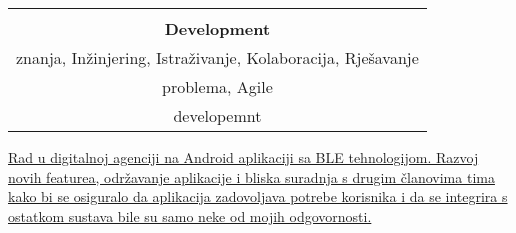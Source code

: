 \documentclass[theme]{cv_style}
\begin{document}
\begin{paracol}{2}
\begin{leftcolumn*}
{            %
            \vspace{1.75\sectionspace}
            \begin{minipage}[c]{\leftcolwidth}
                \begin{tabular}{c}
                    \hspace{-3pt}\bubblediagram{
                        {\textbf{Android} \\ \textbf{Development}},
                        Prenošenje\\znanja,
                        Inžinjering,
                        Istraživanje,
                        Kolaboracija,
                        Rješavanje\\problema,
                        Agile\\developemnt}
                \end{tabular}
            \end{minipage}
        }
        \end{leftcolumn*}
        \begin{rightcolumn}\noindent \small
            \hspace{-2.4pt}
            \href{https://www.cinnamon.agency}{
            {Rad u digitalnoj agenciji na Android aplikaciji sa BLE tehnologijom. Razvoj novih featurea, održavanje aplikacije i bliska suradnja s drugim članovima tima kako bi se osiguralo da aplikacija zadovoljava potrebe korisnika i da se integrira s ostatkom sustava bile su samo neke od mojih odgovornosti.}}

\end{rightcolumn}
\end{paracol}
\end{document}
